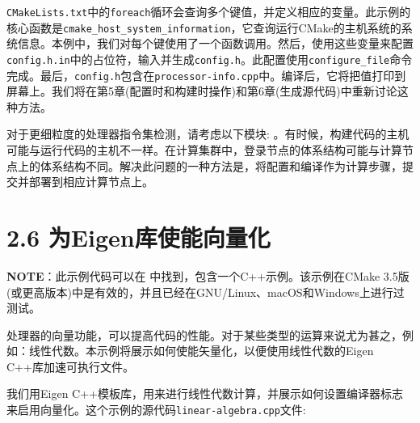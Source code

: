 
\texttt{CMakeLists.txt}中的\texttt{foreach}循环会查询多个键值，并定义相应的变量。此示例的核心函数是\texttt{cmake\_host\_system\_information}，它查询运行CMake的主机系统的系统信息。本例中，我们对每个键使用了一个函数调用。然后，使用这些变量来配置\texttt{config.h.in}中的占位符，输入并生成\texttt{config.h}。此配置使用\texttt{configure\_file}命令完成。最后，\texttt{config.h}包含在\texttt{processor-info.cpp}中。编译后，它将把值打印到屏幕上。我们将在第5章(配置时和构建时操作)和第6章(生成源代码)中重新讨论这种方法。


对于更细粒度的处理器指令集检测，请考虑以下模块:  。有时候，构建代码的主机可能与运行代码的主机不一样。在计算集群中，登录节点的体系结构可能与计算节点上的体系结构不同。解决此问题的一种方法是，将配置和编译作为计算步骤，提交并部署到相应计算节点上。


\section{2.6 为Eigen库使能向量化}

\begin{myInfoBox}
\textbf{NOTE}：此示例代码可以在  中找到，包含一个C++示例。该示例在CMake 3.5版(或更高版本)中是有效的，并且已经在GNU/Linux、macOS和Windows上进行过测试。
\end{myInfoBox}

处理器的向量功能，可以提高代码的性能。对于某些类型的运算来说尤为甚之，例如：线性代数。本示例将展示如何使能矢量化，以便使用线性代数的Eigen C++库加速可执行文件。


我们用Eigen C++模板库，用来进行线性代数计算，并展示如何设置编译器标志来启用向量化。这个示例的源代码\texttt{linear-algebra.cpp}文件:

